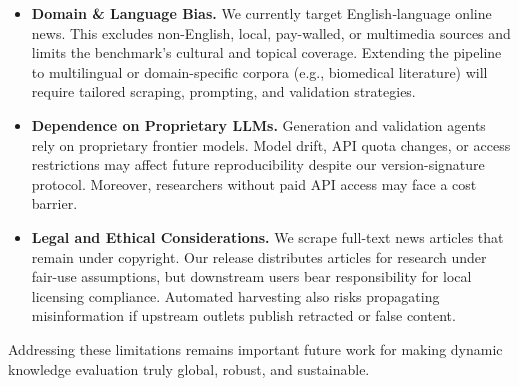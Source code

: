 \documentclass[11pt]{article}
\begin{document}
\begin{itemize}[leftmargin=*]

\item \textbf{Domain \& Language Bias.}  
We currently target English‐language online news.  This excludes non-English, local, pay-walled, or multimedia sources and limits the benchmark’s cultural and topical coverage.  Extending the pipeline to multilingual or domain-specific corpora (e.g., biomedical literature) will require tailored scraping, prompting, and validation strategies.

\item \textbf{Dependence on Proprietary LLMs.}  
Generation and validation agents rely on proprietary frontier models.  Model drift, API quota changes, or access restrictions may affect future reproducibility despite our version-signature protocol.  Moreover, researchers without paid API access may face a cost barrier.

\item \textbf{Legal and Ethical Considerations.}  
We scrape full-text news articles that remain under copyright.  Our release distributes articles for research under fair-use assumptions, but downstream users bear responsibility for local licensing compliance.  Automated harvesting also risks propagating misinformation if upstream outlets publish retracted or false content.

\end{itemize}

\noindent
Addressing these limitations remains important future work for making dynamic knowledge evaluation truly global, robust, and sustainable.











\end{document}
